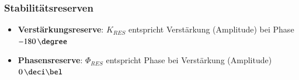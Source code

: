 \subsubsection{Stabilitätsreserven}

\begin{itemize}
    \item \textbf{Verstärkungsreserve}: $K_{RES}$ entspricht Verstärkung (Amplitude) bei Phase $-180 \, \degree$
    \item \textbf{Phasensreserve}: $\Phi_{RES}$ entspricht Phase bei Verstärkung (Amplitude) $0 \, \deci \bel$
\end{itemize}
